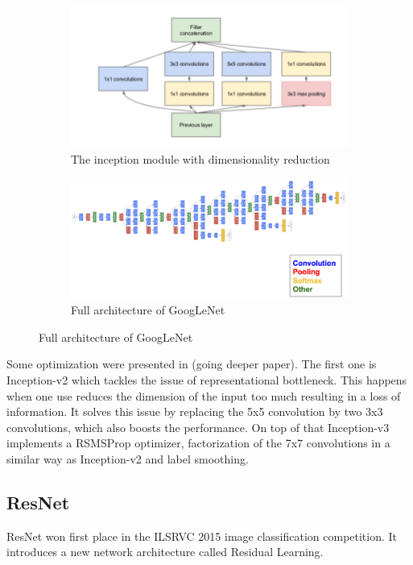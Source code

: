 \begin{figure}
\begin{subfigure}{.5\textwidth}
  \centering
  \includegraphics[width=.8\linewidth]{./figures/02-inception_module}
  \caption{The inception module with dimensionality reduction}
  \label{fig:rotate}
\end{subfigure}%
\begin{subfigure}{.5\textwidth}
  \centering
  \includegraphics[width=.8\linewidth]{./figures/02-googlearch}
  \caption{Full architecture of GoogLeNet}
  \label{fig:googl}
\end{subfigure}
\end{figure}
Some optimization were presented in (going deeper paper). The first one is Inception-v2 which tackles the issue of representational bottleneck. This happens when one use reduces the dimension of the input too much resulting in a loss of information. It solves this issue by replacing the 5x5 convolution by two 3x3 convolutions, which also boosts the performance. On top of that Inception-v3 implements a RSMSProp optimizer, factorization of the 7x7 convolutions in a similar way as Inception-v2 and label smoothing. 

\subsection{ResNet}
ResNet won first place in the ILSRVC 2015 image classification competition. It introduces a new network architecture called Residual Learning. 

